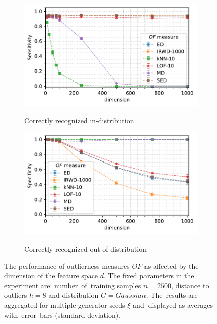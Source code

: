 \begin{figure}[t]
\begin{subfigure}[b]{0.495\textwidth}
        \centering
        \caption{\small Correctly recognized in-distribution}
        \includegraphics[width=\textwidth]{images/distributions/trends-d/trend-distributions-sens_95(dimension)-samples_2500-distance_8-distribution_gaussian-model_ED,IRWD-1000,kNN-10,LOF-10,MD,SED-aggregated.pdf}
        \label{fig:dimension-sensitivity}
    \end{subfigure}
    \hfill
    \begin{subfigure}[b]{0.495\textwidth}
        \centering
        \caption{\small Correctly recognized out-of-distribution}
        \includegraphics[width=\textwidth]{images/distributions/trends-d/trend-distributions-spec_95(dimension)-samples_2500-distance_8-distribution_gaussian-model_ED,IRWD-1000,kNN-10,LOF-10,MD,SED-aggregated.pdf}
        \label{fig:dimension-specificity}
    \end{subfigure}
    \caption{The performance of outlierness measures $OF$ as affected by the dimension of  the feature space $d$. The fixed parameters in the experiment are: number~of~training samples $n = 2500$, distance to outliers $h = 8$ and distribution $G = Gaussian$. The~results are aggregated for multiple generator seeds $\xi$ and~displayed as averages with~error~bars (standard deviation).}
    \label{fig:dimension}
    \vspace{-1.0em}
\end{figure}

